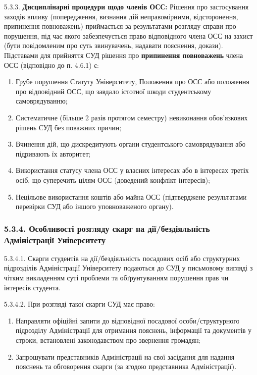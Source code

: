     5.3.3. \textbf{Дисциплінарні процедури щодо членів ОСС:} Рішення про застосування заходів впливу (попередження, визнання дій неправомірними, відсторонення, припинення повноважень) приймається за результатами розгляду справи про порушення, під час якого забезпечується право відповідного члена ОСС на захист (бути повідомленим про суть звинувачень, надавати пояснення, докази). Підставами для прийняття СУД рішення про \textbf{припинення повноважень} члена ОСС (відповідно до п. 4.6.1) є:
        \begin{enumerate}[label=\roman*)]
            \item Грубе порушення Статуту Університету, Положення про ОСС або положення про відповідний ОСС, що завдало істотної шкоди студентському самоврядуванню;
            \item Систематичне (більше 2 разів протягом семестру) невиконання обов'язкових рішень СУД без поважних причин;
            \item Вчинення дій, що дискредитують органи студентського самоврядування або підривають їх авторитет;
            \item Використання статусу члена ОСС у власних інтересах або в інтересах третіх осіб, що суперечить цілям ОСС (доведений конфлікт інтересів);
            \item Нецільове використання коштів або майна ОСС (підтверджене результатами перевірки СУД або іншого уповноваженого органу).
        \end{enumerate}

    \subsubsection*{5.3.4. Особливості розгляду скарг на дії/бездіяльність Адміністрації Університету}
        5.3.4.1. Скарги студентів на дії/бездіяльність посадових осіб або структурних підрозділів Адміністрації Університету подаються до СУД у письмовому вигляді з чітким викладенням суті проблеми та обґрунтуванням порушення прав чи інтересів студента.

        5.3.4.2. При розгляді такої скарги СУД має право:
            \begin{enumerate}[label=\alph*)]
                \item Направляти офіційні запити до відповідної посадової особи/структурного підрозділу Адміністрації для отримання пояснень, інформації та документів у строки, встановлені законодавством про звернення громадян;
                \item Запрошувати представників Адміністрації на свої засідання для надання пояснень та обговорення скарги (за згодою представника Адміністрації).
            \end{enumerate}

